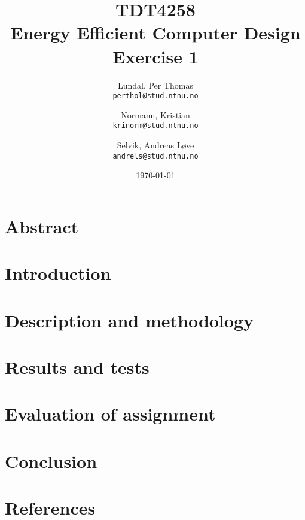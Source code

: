 \documentclass[a4paper,12pt]{article}
\title{TDT4258\\ Energy Efficient Computer Design
	\\Exercise 1}
\author{
    Lundal, Per Thomas\\
    \texttt{perthol@stud.ntnu.no}
    \and
    Normann, Kristian\\
    \texttt{krinorm@stud.ntnu.no}
    \and
    Selvik, Andreas Løve\\
    \texttt{andrels@stud.ntnu.no}
}
\date{\today}
\begin{document}
\maketitle

\clearpage
\section*{Abstract}
\clearpage



\tableofcontents


\clearpage
\section{Introduction}


\clearpage
\section{Description and methodology}


\clearpage
\section{Results and tests}


\clearpage
\section{Evaluation of assignment}

\clearpage
\section{Conclusion}

\clearpage
\section{References}
\end{document}
